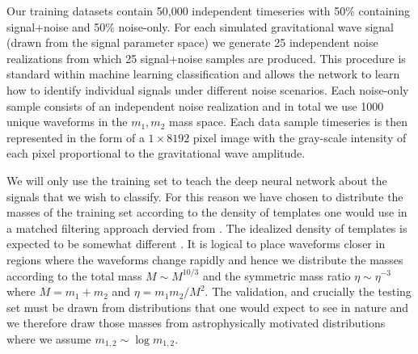 \documentclass[%
showpacs,
 amsmath,amssymb,
 aps,
 twocolumn,
 prl,
 reprint,
floatfix,
]{revtex4-1}
\begin{document}
%
%
Our training datasets contain 50,000 independent timeseries with 50\% containing
signal+noise and 50\% noise-only. For each simulated gravitational wave signal
(drawn from the signal parameter space) we generate 25 independent noise
realizations from which 25 signal+noise samples are produced. This procedure is
standard within machine learning classification and allows the network to learn
how to identify individual signals under different noise scenarios. Each
noise-only sample consists of an independent noise realization and in total we
use 1000 unique waveforms in the $m_{1},m_{2}$ mass space. Each data sample
timeseries is then represented in the form of a $1 \times 8192$ pixel image
with the gray-scale intensity of each pixel proportional to the gravitational
wave amplitude.

%
%
We will only use the training set to teach the deep neural network about the
signals that we wish to classify. For this reason we have chosen to distribute
the masses of the training set according to the density of templates one would
use in a matched filtering approach dervied from \cite{0264-9381-23-18-002}. 
The idealized density of templates is expected to be somewhat different \cite{PhysRevD.91.124042}. 
It is logical to place waveforms closer in
regions where the waveforms change rapidly and hence we distribute the masses
according to the total mass $M\sim M^{10/3}$ and the symmetric mass ratio
$\eta\sim \eta^{-3}$ where $M=m_{1}+m_{2}$ and $\eta=m_{1}m_{2}/M^{2}$. The
validation, and crucially the testing set must be drawn from distributions that
one would expect to see in nature and we therefore draw those masses from
astrophysically motivated distributions where we assume $m_{1,2}\sim
\log{m_{1,2}}$.   
\end{document}
